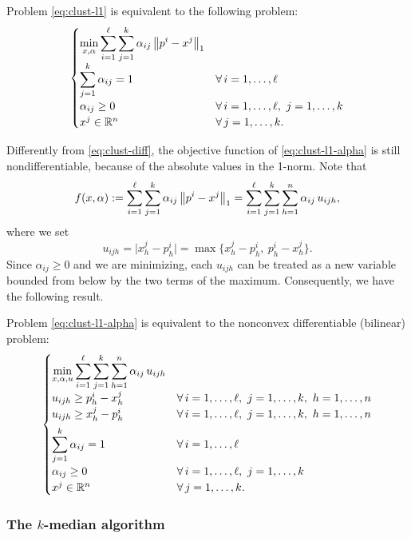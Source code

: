 \begin{theorem}
Problem \eqref{eq:clust-l1} is equivalent to the following problem:
\begin{equation}\label{eq:clust-l1-alpha}
\begin{cases}
\displaystyle \min_{x,\alpha} \sum_{i=1}^{\ell}\sum_{j=1}^{k} \alpha_{ij}\left\lVert p^i - x^j \right\rVert_1\\[1ex]
\displaystyle \sum_{j=1}^{k} \alpha_{ij} = 1 & \forall\, i=1,\dots,\ell\\[1ex]
\alpha_{ij} \ge 0 & \forall\, i=1,\dots,\ell,\ j=1,\dots,k\\
x^j \in \mathbb{R}^n & \forall\, j=1,\dots,k.
\end{cases}
\end{equation}
\end{theorem}

Differently from \eqref{eq:clust-diff}, the objective function of \eqref{eq:clust-l1-alpha} is still nondifferentiable, because of the absolute values in the 1-norm. Note that
\[
f(x,\alpha) := \sum_{i=1}^{\ell}\sum_{j=1}^{k} \alpha_{ij}\left\lVert p^i - x^j \right\rVert_1 = \sum_{i=1}^{\ell}\sum_{j=1}^{k}\sum_{h=1}^{n} \alpha_{ij}\, u_{ijh},
\]
where we set
\[
u_{ijh} = \lvert x^j_h - p^i_h \rvert = \max\{x^j_h - p^i_h,\ p^i_h - x^j_h\}.
\]
Since $\alpha_{ij} \ge 0$ and we are minimizing, each $u_{ijh}$ can be treated as a new variable bounded from below by the two terms of the maximum. Consequently, we have the following result.

\begin{theorem}
Problem \eqref{eq:clust-l1-alpha} is equivalent to the nonconvex differentiable (bilinear) problem:
\[
\begin{cases}
\displaystyle \min_{x,\alpha,u} \sum_{i=1}^{\ell}\sum_{j=1}^{k}\sum_{h=1}^{n} \alpha_{ij}\, u_{ijh}\\[1ex]
u_{ijh} \ge p^i_h - x^j_h & \forall\, i=1,\dots,\ell,\ j=1,\dots,k,\ h=1,\dots,n\\
u_{ijh} \ge x^j_h - p^i_h & \forall\, i=1,\dots,\ell,\ j=1,\dots,k,\ h=1,\dots,n\\[1ex]
\displaystyle \sum_{j=1}^{k} \alpha_{ij} = 1 & \forall\, i=1,\dots,\ell\\[1ex]
\alpha_{ij} \ge 0 & \forall\, i=1,\dots,\ell,\ j=1,\dots,k\\
x^j \in \R^n & \forall\, j=1,\dots,k.
\end{cases}
\]
\end{theorem}

\subsubsection{The \texorpdfstring{$k$}{k}-median algorithm}

